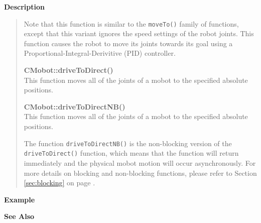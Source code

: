 {\bf Description}\\
\vspace{-12pt}
\begin{quote}
Note that this function is similar to the \texttt{moveTo()} family of functions, except
that this variant ignores the speed settings of the robot joints. This function causes
the robot to move its joints towards its goal using a Proportional-Integral-Derivitive (PID)
controller.

{\bf CMobot::driveToDirect()}\\
This function moves all of the joints of a mobot to the specified absolute positions. 

{\bf CMobot::driveToDirectNB()}\\
This function moves all of the joints of a mobot to the specified absolute positions. 

The function \texttt{driveToDirectNB()} is the non-blocking version of
the \texttt{driveToDirect()} function, which means that the function will return
immediately and the physical mobot motion will occur asynchronously. For
more details on blocking and non-blocking functions, please refer to 
Section \ref{sec:blocking} on page \pageref{sec:blocking}.\\
\end{quote}

\noindent
{\bf Example}\\
\noindent

\noindent
{\bf See Also}\\

